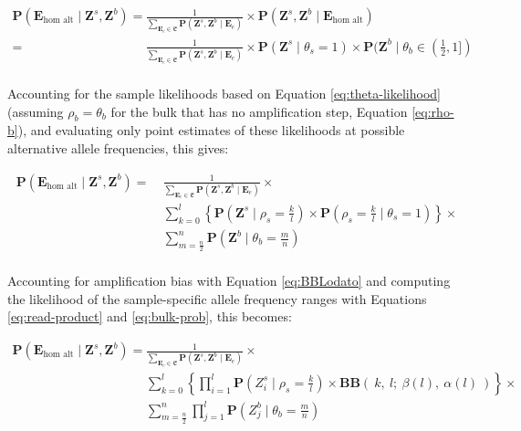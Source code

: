 \documentclass[fleqn,12pt,inline]{wlscirep}
\newcommand{\Prob}{{\mathbf{P}}}
\newcommand{\cB}{{\mathbf{B}}}
\begin{document}
\begin{equation}
 \label{eq:hom-alt-posterior-samples}
 \begin{split}
  \Prob(\boldsymbol{E}_{\text{hom alt}} \mid \boldsymbol{Z}^s,\boldsymbol{Z}^b)
    =~&\frac{1}{\sum_{\boldsymbol{E}_e \in \mathfrak{E}}{\Prob(\boldsymbol{Z}^s,\boldsymbol{Z}^b \mid \boldsymbol{E}_e )}} \times
      \Prob(\boldsymbol{Z}^s,\boldsymbol{Z}^b \mid \boldsymbol{E}_{\text{hom alt}}) \\
    =~&\frac{1}{\sum_{\boldsymbol{E}_e \in \mathfrak{E}}{\Prob(\boldsymbol{Z}^s,\boldsymbol{Z}^b \mid \boldsymbol{E}_e )}} \times
      \Prob(\boldsymbol{Z}^s \mid \theta_s = 1) \times \Prob(\boldsymbol{Z}^b \mid \theta_b \in (\frac12,1])\\
  \end{split}    
\end{equation}

Accounting for the sample likelihoods based on Equation \ref{eq:theta-likelihood} (assuming $\rho_b = \theta_b$ for the bulk that has no amplification step, Equation \ref{eq:rho-b}), and evaluating only point estimates of these likelihoods at possible alternative allele frequencies, this gives:

\begin{equation}
 \label{eq:hom-alt-posterior-likelihoods}
 \begin{split}   
 \Prob(\boldsymbol{E}_{\text{hom alt}} \mid \boldsymbol{Z}^s,\boldsymbol{Z}^b)
   =~&\frac{1}{\sum_{\boldsymbol{E}_e \in \mathfrak{E}}{\Prob(\boldsymbol{Z}^s,\boldsymbol{Z}^b \mid \boldsymbol{E}_e )}} \times \\
     &\sum_{k=0}^{l} \left\{ \Prob(\boldsymbol{Z}^s \mid \rho_s = \frac{k}{l}) \times \Prob(\rho_s = \frac{k}{l} \mid \theta_s =  1)\right\} \times \\
     &\sum_{m=\frac{n}{2}}^{n} \Prob(\boldsymbol{Z}^b \mid \theta_b = \frac{m}{n})\\
  \end{split}    
\end{equation}

Accounting for amplification bias with Equation \ref{eq:BBLodato} and computing the likelihood of the sample-specific allele frequency ranges with Equations \ref{eq:read-product} and \ref{eq:bulk-prob}, this becomes:

\begin{equation}
 \label{eq:hom-alt-posterior-reads}
 \begin{split}   
 \Prob(\boldsymbol{E}_{\text{hom alt}} \mid \boldsymbol{Z}^s,\boldsymbol{Z}^b)
   =~&\frac{1}{\sum_{\boldsymbol{E}_e \in \mathfrak{E}}{\Prob(\boldsymbol{Z}^s,\boldsymbol{Z}^b \mid \boldsymbol{E}_e )}} \times \\
      &\sum_{k=0}^{l} \left\{ \prod_{i=1}^l \Prob(Z_i^s \mid \rho_s = \frac{k}{l}) \times \cB\cB(~ k,~ l;~ \beta(l),~ \alpha(l)~ ) \right\} \times\\
      &\sum_{m=\frac{n}{2}}^{n} \prod_{j=1}^l \Prob\left(Z_j^b \mid \theta_b = \frac{m}{n} \right)\\
  \end{split}    
\end{equation}
\end{document}
